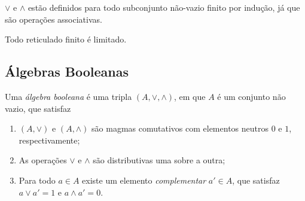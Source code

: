 $\vee$ e $\wedge$ estão definidos para todo subconjunto não-vazio finito por indução, já que são operações associativas.

\begin{prop}
Todo reticulado finito é limitado.
\end{prop}

\subsection{Álgebras Booleanas}
\begin{defi}
Uma \emph{álgebra booleana} é uma tripla $(A, \vee ,\wedge)$, em que $A$ é um conjunto não vazio, que satisfaz
	\begin{enumerate}
	\item $(A,\vee)$ e $(A,\wedge)$ são magmas comutativos com elementos neutros $0$ e $1$, respectivamente;
	\item As operações $ \vee $ e $\wedge$ são distributivas uma sobre a outra;
	\item Para todo $a \in A$ existe um elemento \emph{complementar} $a' \in A$, que satisfaz $a \vee a'=1$ e $a \wedge a' = 0$.
	\end{enumerate}
\end{defi}

